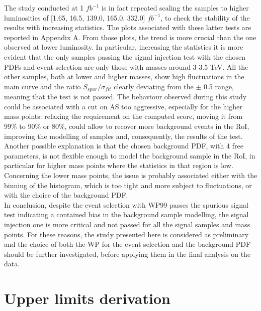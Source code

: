 \noindent The study conducted at 1 $fb^{-1}$ is in fact repeated scaling the samples to higher luminosities of [1.65, 16.5, 139.0, 165.0, 332.0]  $fb^{-1}$, to check the stability of the results with increasing statistics.
The plots associated with these latter tests are reported in Appendix A.
From those plots, the trend is more crucial than the one observed at lower luminosity.
In particular, increasing the statistics it is more evident that the only samples passing the signal injection test with the chosen PDFs and event selection are only those with masses around 3-3.5 TeV.
All the other samples, both at lower and higher masses, show high fluctuations in the main curve and the ratio $S_{spur}/\sigma_{fit}$ clearly deviating from the $\pm$ 0.5 range, meaning that the test is not passed.
The behaviour observed during this study could be associated with a cut on AS too aggressive, especially for the higher mass points: relaxing the requirement on the computed score, moving it from 99\% to 90\% or 80\%, could allow to recover more background events in the RoI, improving the modelling of samples and, consequently, the results of the test.
Another possible explanation is that the chosen background PDF, with 4 free parameters, is not flexible enough to model the background sample in the RoI, in particular for higher mass points where the statistics in that region is low.
Concerning the lower mass points, the issue is probably associated either with the binning of the histogram, which is too tight and more subject to fluctuations, or with the choice of the background PDF.\\
In conclusion, despite the event selection with WP99 passes the spurious signal test indicating a contained bias in the background sample modelling, the signal injection one is more critical and not passed for all the signal samples and mass points.
For these reasons, the study presented here is considered as preliminary and the choice of both the WP for the event selection and the background PDF should be further investigated, before applying them in the final analysis on the data.


\section{Upper limits derivation}\label{sec:ADJJ/UpperLimits}

